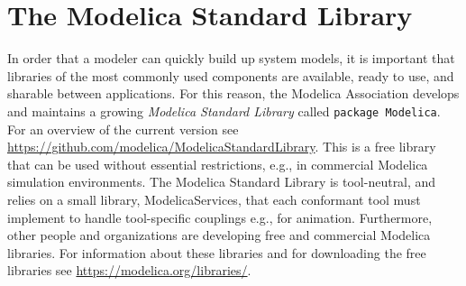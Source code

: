 \chapter{The Modelica Standard Library}\label{the-modelica-standard-library}

In order that a modeler can quickly build up system models, it is
important that libraries of the most commonly used components are
available, ready to use, and sharable between applications. For this
reason, the Modelica Association develops and maintains a growing
\emph{Modelica Standard Library} called \lstinline!package Modelica!. For an
overview of the current version see
\url{https://github.com/modelica/ModelicaStandardLibrary}.
This is a free library that can be used without essential restrictions, e.g., in
commercial Modelica simulation environments. The Modelica Standard
Library is tool-neutral, and relies on a small library,
ModelicaServices, that each conformant tool must implement to handle
tool-specific couplings e.g., for animation. Furthermore, other people
and organizations are developing free and commercial Modelica libraries.
For information about these libraries and for downloading the free
libraries see \url{https://modelica.org/libraries/}.
